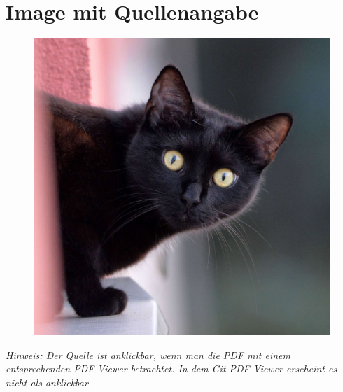 \documentclass{scrarticle}
\begin{document}
	\section{Image mit Quellenangabe}
	\begin{figure}[h!hbt]
		\centering
		\includegraphics[width=\linewidth]{./Abbildungen/Beispiel.jpg}
	\end{figure}
	\noindent \textit{Hinweis: Der Quelle ist anklickbar, wenn man die PDF mit einem entsprechenden PDF-Viewer betrachtet. In dem Git-PDF-Viewer erscheint es nicht als anklickbar.}
\end{document}
